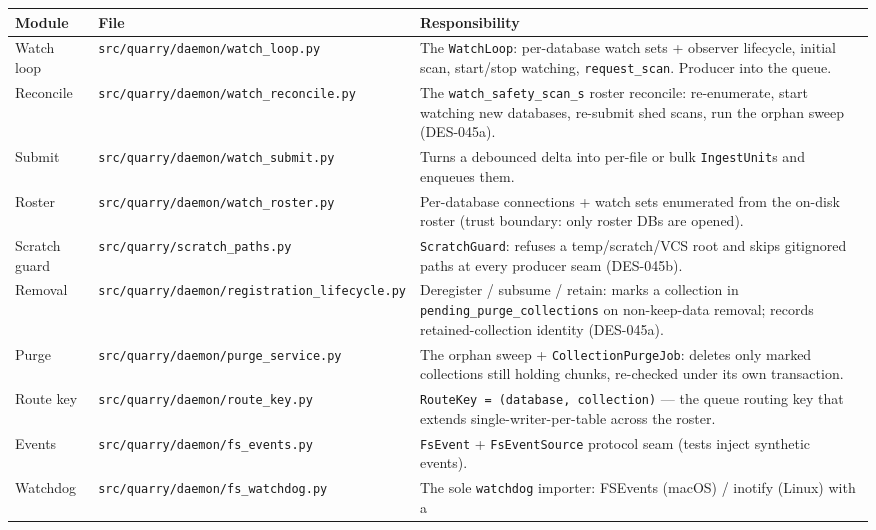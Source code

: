 \documentclass[a4paper,10pt]{article}
\newcommand{\modpath}[1]{\texttt{src/quarry/#1}}
\begin{document}
\begin{center}
\begin{tabular}{llp{6.6cm}}
\toprule
\textbf{Module} & \textbf{File} & \textbf{Responsibility} \\
\midrule
Watch loop  & \modpath{daemon/watch\_loop.py}   & The \texttt{WatchLoop}:
              per-database watch sets + observer lifecycle, initial scan,
              start/stop watching, \texttt{request\_scan}.  Producer into
              the queue. \\
Reconcile   & \modpath{daemon/watch\_reconcile.py} & The
              \texttt{watch\_safety\_scan\_s} roster reconcile: re-enumerate,
              start watching new databases, re-submit shed scans, run the
              orphan sweep (DES-045a). \\
Submit      & \modpath{daemon/watch\_submit.py} & Turns a debounced delta
              into per-file or bulk \texttt{IngestUnit}s and enqueues them. \\
Roster      & \modpath{daemon/watch\_roster.py} & Per-database connections +
              watch sets enumerated from the on-disk roster (trust boundary:
              only roster DBs are opened). \\
Scratch guard & \modpath{scratch\_paths.py}    & \texttt{ScratchGuard}: refuses
              a temp/scratch/VCS root and skips gitignored paths at every
              producer seam (DES-045b). \\
Removal     & \modpath{daemon/registration\_lifecycle.py} & Deregister /
              subsume / retain: marks a collection in
              \texttt{pending\_purge\_collections} on non-keep-data removal;
              records retained-collection identity (DES-045a). \\
Purge       & \modpath{daemon/purge\_service.py} & The orphan sweep +
              \texttt{CollectionPurgeJob}: deletes only marked collections
              still holding chunks, re-checked under its own transaction. \\
Route key   & \modpath{daemon/route\_key.py}   & \texttt{RouteKey =
              (database, collection)} --- the queue routing key that extends
              single-writer-per-table across the roster. \\
Events      & \modpath{daemon/fs\_events.py}    & \texttt{FsEvent} +
              \texttt{FsEventSource} protocol seam (tests inject synthetic
              events). \\
Watchdog    & \modpath{daemon/fs\_watchdog.py}  & The sole \texttt{watchdog}
              importer: FSEvents (macOS) / inotify (Linux) with a

\end{tabular}
\end{center}
\end{document}
